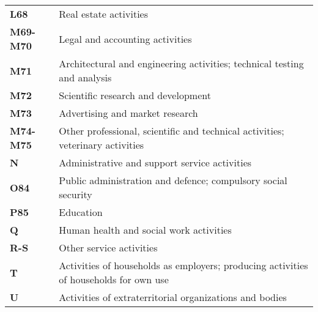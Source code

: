 \documentclass[11pt,a4paper]{article}
\begin{document}
\begin{table}[!h]
\begin{tabular}{ll}
\textbf{L68} &{Real estate activities}\\
\textbf{M69-M70} &{Legal and accounting activities}\\
\textbf{M71} &{Architectural and engineering activities; technical testing and analysis}\\
\textbf{M72} &{Scientific research and development}\\
\textbf{M73} &{Advertising and market research}\\
\textbf{M74-M75} &{Other professional, scientific and technical activities; veterinary activities}\\
\textbf{N} &{Administrative and support service activities}\\
\textbf{O84} &{Public administration and defence; compulsory social security}\\
\textbf{P85} &{Education}\\
\textbf{Q} &{Human health and social work activities}\\
\textbf{R-S} &{Other service activities}\\
\textbf{T} &{Activities of households as employers; producing activities of households for own use}\\
\textbf{U} &{Activities of extraterritorial organizations and bodies}\\
  	\end{tabular}
\label{tab:wiodindustries}
\end{table}

\end{document}
